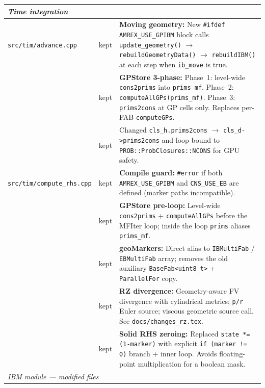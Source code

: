 \documentclass[11pt,a4paper]{article}
\begin{document}
\begin{longtable}{p{4.2cm} p{1.2cm} p{8.5cm}}
\midrule
\multicolumn{3}{l}{\textit{Time integration}} \\
\midrule

\texttt{src/tim/advance.cpp}
  & \color{kept}kept
  & \textbf{Moving geometry:} New \texttt{\#ifdef AMREX\_USE\_GPIBM}
    block calls \texttt{update\_geometry()} $\to$
    \texttt{rebuildGeometryData()} $\to$ \texttt{rebuildIBM()} at each
    step when \texttt{ib\_move} is true. \\

  & \color{kept}kept
  & \textbf{GPStore 3-phase:}
    Phase~1: level-wide \texttt{cons2prims} into \texttt{prims\_mf}.
    Phase~2: \texttt{computeAllGPs(prims\_mf)}.
    Phase~3: \texttt{prims2cons} at GP cells only.
    Replaces per-FAB \texttt{computeGPs}. \\

  & \color{kept}kept
  & Changed \texttt{cls\_h.prims2cons} $\to$ \texttt{cls\_d->prims2cons}
    and loop bound to \texttt{PROB::ProbClosures::NCONS} for GPU safety. \\

\texttt{src/tim/compute\_rhs.cpp}
  & \color{kept}kept
  & \textbf{Compile guard:}
    \texttt{\#error} if both \texttt{AMREX\_USE\_GPIBM} and
    \texttt{CNS\_USE\_EB} are defined (marker paths incompatible). \\

  & \color{kept}kept
  & \textbf{GPStore pre-loop:} Level-wide \texttt{cons2prims} +
    \texttt{computeAllGPs} before the MFIter loop; inside the loop
    \texttt{prims} aliases \texttt{prims\_mf}. \\

  & \color{kept}kept
  & \textbf{geoMarkers:} Direct alias to \texttt{IBMultiFab} /
    \texttt{EBMultiFab} array; removes the old auxiliary
    \texttt{BaseFab<uint8\_t>} + \texttt{ParallelFor} copy. \\

  & \color{kept}kept
  & \textbf{RZ divergence:} Geometry-aware FV divergence with
    cylindrical metrics; \texttt{p/r} Euler source; viscous geometric
    source call.  See \texttt{docs/changes\_rz.tex}. \\

  & \color{kept}kept
  & \textbf{Solid RHS zeroing:} Replaced \texttt{state *= (1-marker)}
    with explicit \texttt{if (marker != 0)} branch + inner loop.
    Avoids floating-point multiplication for a boolean mask. \\

\midrule
\multicolumn{3}{l}{\textit{IBM module --- modified files}} \\
\midrule


\end{longtable}
\end{document}
